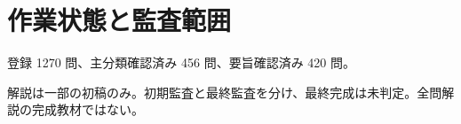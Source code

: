 \chapter{作業状態と監査範囲}
登録 1270 問、主分類確認済み 456 問、要旨確認済み 420 問。
\par 解説は一部の初稿のみ。初期監査と最終監査を分け、最終完成は未判定。全問解説の完成教材ではない。
